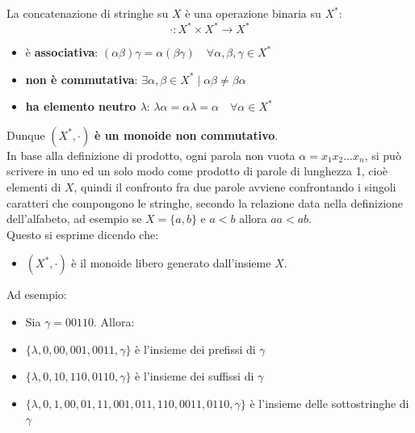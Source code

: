 \documentclass[12pt]{report}
\begin{document}
	La concatenazione di stringhe su $X$ è una operazione binaria su $X^*$:
	\[
	\cdot: X^* \times X^* \to X^*
	\]
	\begin{itemize}
		\item è \textbf{associativa}: $(\alpha\beta)\gamma=\alpha(\beta\gamma) \quad \forall \alpha, \beta, \gamma \in X^*$
		\item \textbf{non è commutativa}: $\exists \alpha, \beta \in X^* \mid \alpha\beta \neq \beta\alpha$
		\item \textbf{ha elemento neutro $\lambda$}:	 $\lambda\alpha=\alpha\lambda=\alpha \quad \forall \alpha \in X^*$
	\end{itemize}
	Dunque $(X^*, \cdot)$ \textbf{è un monoide non commutativo}. \\
	In base alla definizione di prodotto, ogni parola non vuota $\alpha=x_1x_2\dots x_n$, si può scrivere in uno ed un solo modo come prodotto di parole di lunghezza 1, cioè elementi di $X$, quindi il confronto fra due parole avviene confrontando i singoli caratteri che compongono le stringhe, secondo la relazione data nella definizione dell'alfabeto, ad esempio se $X = \{a, b\}$ e $a < b$ allora $aa < ab$. \\
	Questo si esprime dicendo che:
	\begin{itemize}
		\item $(X^*, \cdot)$ è il monoide libero generato dall'insieme $X$.
	\end{itemize}
	{
	}
	Ad esempio:
	\begin{itemize}
		\item Sia $\gamma = 00110$. Allora:
		\item $\{\lambda, 0, 00, 001, 0011, \gamma\}$ è l'insieme dei prefissi di $\gamma$
		\item $\{\lambda, 0, 10, 110, 0110, \gamma\}$ è l'insieme dei suffissi di $\gamma$
		\item $\{\lambda, 0, 1, 00, 01, 11, 001, 011, 110, 0011, 0110, \gamma\}$ è l'insieme delle sottostringhe di $\gamma$
	\end{itemize}
	{
	} \\
\end{document}

